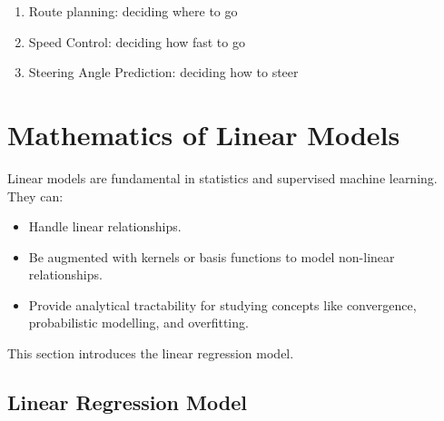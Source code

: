 \begin{enumerate}
\begin{itemize}
\begin{figure}[H]
                    \end{figure}
                    



          \end{itemize}
    \item Route planning: deciding where to go
    \item Speed Control: deciding how fast to go
    \item Steering Angle Prediction: deciding how to steer
\end{enumerate}

\section{Mathematics of Linear Models}

Linear models are fundamental in statistics and supervised machine learning. They can:
\begin{itemize}
    \item Handle linear relationships.
    \item Be augmented with kernels or basis functions to model non-linear relationships.
    \item Provide analytical tractability for studying concepts like convergence, probabilistic modelling, and overfitting.
\end{itemize}
This section introduces the linear regression model.

\subsection{Linear Regression Model}

